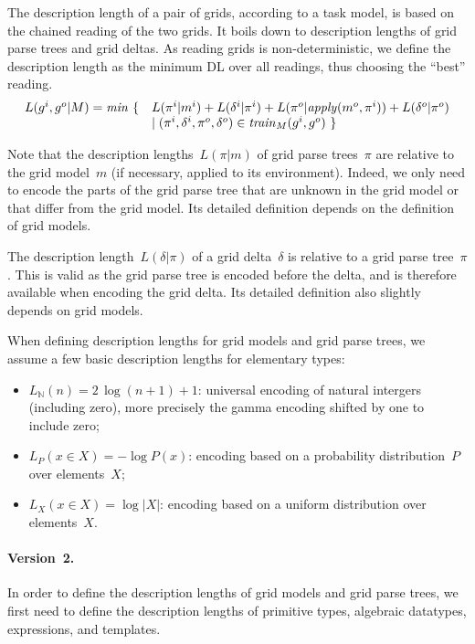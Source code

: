 \documentclass[a4paper]{llncs}
\newcommand{\nat}{\mathbb{N}}
\begin{document}
The description length of a pair of grids, according to a task model,
is based on the chained reading of the two grids. It boils down to
description lengths of grid parse trees and grid deltas. As reading
grids is non-deterministic, we define the description length as the
minimum DL over all readings, thus choosing the ``best'' reading.
\[\begin{array}{ll}
    L(g^i,g^o|M) = {\it min}\ \{ & L(\pi^i|m^i) + L(\delta^i|\pi^i) + L(\pi^o|{\it apply}(m^o,\pi^i)) + L(\delta^o|\pi^o)\\
                             & \mid (\pi^i,\delta^i,\pi^o,\delta^o) \in {\it train}_M(g^i,g^o)\ \}
  \end{array}\]

Note that the description lengths~$L(\pi|m)$ of grid parse trees~$\pi$
are relative to the grid model~$m$ (if necessary, applied to its
environment). Indeed, we only need to encode the parts of the grid
parse tree that are unknown in the grid model or that differ from the
grid model. Its detailed definition depends on the definition of grid
models.

The description length~$L(\delta|\pi)$ of a grid delta~$\delta$ is
relative to a grid parse tree~$\pi$. This is valid as the grid parse
tree is encoded before the delta, and is therefore available when
encoding the grid delta. Its detailed definition also slightly depends
on grid models.

When defining description lengths for grid models and grid parse
trees, we assume a few basic description lengths for elementary types:
\begin{itemize}
\item $L_\nat(n) = 2\,\log (n+1) + 1$: universal encoding of natural
  intergers (including zero), more precisely the gamma encoding
  shifted by one to include zero;
\item $L_P(x \in X) = -\log P(x)$: encoding based on a probability distribution~$P$ over elements~$X$;
\item $L_X(x \in X) = \log |X|$: encoding based on a uniform distribution over elements~$X$.
\end{itemize}


\paragraph{Version~2.}
In order to define the description lengths of grid models and grid
parse trees, we first need to define the description lengths of
primitive types, algebraic datatypes, expressions, and templates.
\end{document}
